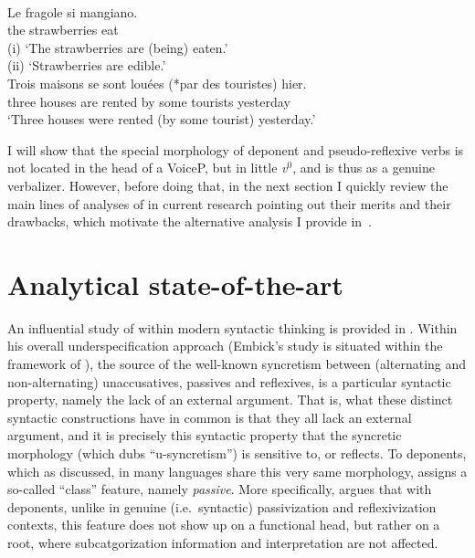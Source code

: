 \documentclass[output=paper]{langsci/langscibook}
\begin{document}
\ea\label{ex:10.11} \\
    \gll Le  fragole      si    mangiano.\\
        the strawberries  \Refl{}  eat\\
    \glt (i) ‘The strawberries are (being) eaten.’\\
        (ii) ‘Strawberries are edible.’
\ex\label{ex:10.12} \\
    \gll Trois maisons  se    sont  louées (*par des touristes) hier.\\
        three houses \Refl{}  are  rented \hphantom{(*}by some tourists yesterday\\
    \glt ‘Three houses were rented (by some tourist) yesterday.’
\z

I will show that the special morphology of deponent and pseudo-reflexive verbs
is not located in the head of a VoiceP, but in little \emph{v}$^0$, and is thus
as a genuine verbalizer. However, before doing that, in the next section I
quickly review the main lines of analyses of  in current research
pointing out their merits and their drawbacks, which motivate the alternative
analysis I provide in~.

\section{Analytical state-of-the-art}\label{sec:10.3}

An influential study of  within modern syntactic thinking is
pro\-vi\-ded in \citet{Embick1997}. Within his overall underspecification
approach (Embick’s study is situated within the framework of ), the source of the well-known syncretism between (alternating and
non-alternating) unaccusatives, passives and reflexives, is a particular
syntactic property, namely the lack of an external argument. That is, what
these distinct syntactic constructions have in common is that they all lack an
external argument, and it is precisely this syntactic property that the
syncretic morphology (which \citeauthor{Embick1997} dubs “u-syn\-cre\-tism”) is
sensitive to, or reflects. To deponents, which as discussed, in many languages
share this very same morphology, \citeauthor{Embick1997} assigns a so-called
“class” feature, namely \emph{passive}. More specifically,
\citeauthor{Embick1997} argues that with deponents, unlike in genuine (i.e.\
syntactic) passivization and reflexivization contexts, this feature does not
show up on a functional head\is{functional items}, but rather on a root, where subcatgorization
information and interpretation are not affected.
\end{document}
